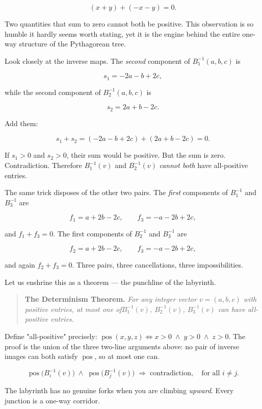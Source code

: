 \documentclass[11pt,twoside,openright]{book}
\theoremstyle{definition}
\theoremstyle{remark}
\begin{document}
\[(x + y) + (-x - y) = 0.\]

Two quantities that sum to zero cannot both be positive. This observation is so humble it hardly seems worth stating, yet it is the engine behind the entire one-way structure of the Pythagorean tree.

Look closely at the inverse maps. The \textit{second} component of $B_1^{-1}(a, b, c)$ is

\[s_1 = -2a - b + 2c,\]

while the second component of $B_2^{-1}(a, b, c)$ is

\[s_2 = 2a + b - 2c.\]

Add them:

\[s_1 + s_2 = (-2a - b + 2c) + (2a + b - 2c) = 0.\]

If $s_1 > 0$ and $s_2 > 0$, their sum would be positive. But the sum is zero. Contradiction. Therefore $B_1^{-1}(v)$ and $B_2^{-1}(v)$ \textit{cannot both} have all-positive entries.

The same trick disposes of the other two pairs. The \textit{first} components of $B_1^{-1}$ and $B_3^{-1}$ are

\[f_1 = a + 2b - 2c, \qquad f_3 = -a - 2b + 2c,\]

and $f_1 + f_3 = 0$. The first components of $B_2^{-1}$ and $B_3^{-1}$ are

\[f_2 = a + 2b - 2c, \qquad f_3 = -a - 2b + 2c,\]

and again $f_2 + f_3 = 0$. Three pairs, three cancellations, three impossibilities.

Let us enshrine this as a theorem --- the punchline of the labyrinth.

\begin{quote}
\textbf{The Determinism Theorem.} \textit{For any integer vector $v = (a, b, c)$ with positive entries, at most one of$B_1^{-1}(v)$, $B_2^{-1}(v)$, $B_3^{-1}(v)$ can have all-positive entries.}
\end{quote}
Define "all-positive" precisely: $\operatorname{pos}(x, y, z) \iff x > 0 \;\wedge\; y > 0 \;\wedge\; z > 0$. The proof is the union of the three two-line arguments above: no pair of inverse images can both satisfy $\operatorname{pos}$, so at most one can.

\[\operatorname{pos}\!\bigl(B_i^{-1}(v)\bigr) \;\wedge\; \operatorname{pos}\!\bigl(B_j^{-1}(v)\bigr) \;\Longrightarrow\; \text{contradiction}, \quad \text{for all } i \neq j.\]

The labyrinth has no genuine forks when you are climbing \textit{upward}. Every junction is a one-way corridor.
\end{document}
